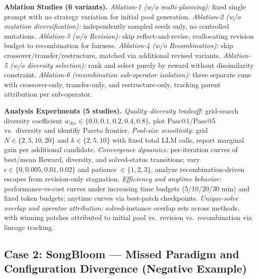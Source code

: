 \begin{tcolorbox}
\smallskip
\textbf{Ablation Studies (6 variants).} \textit{Ablation-1 (w/o multi-planning):} fixed single prompt with no strategy variation for initial pool generation. \textit{Ablation-2 (w/o mutation diversification):} independently sampled seeds only, no controlled mutations. \textit{Ablation-3 (w/o Revision):} skip reflect-and-revise, reallocating revision budget to recombination for fairness. \textit{Ablation-4 (w/o Recombination):} skip crossover/transfer/restructure, matched via additional revised variants. \textit{Ablation-5 (w/o diversity selection):} rank and select purely by reward without dissimilarity constraint. \textit{Ablation-6 (recombination sub-operator isolation):} three separate runs with crossover-only, transfer-only, and restructure-only, tracking parent attribution per sub-operator.

\smallskip
\textbf{Analysis Experiments (5 studies).} \textit{Quality--diversity tradeoff:} grid-search diversity coefficient $w_{div} \in \{0.0,0.1,0.2,0.4,0.8\}$, plot Pass@1/Pass@5 vs.\ diversity and identify Pareto frontier. \textit{Pool-size sensitivity:} grid $N \in \{2,5,10,20\}$ and $k \in \{2,5,10\}$ with fixed total LLM calls, report marginal gain per additional candidate. \textit{Convergence dynamics:} per-iteration curves of best/mean Reward, diversity, and solved-status transitions; vary $\epsilon \in \{0,0.005,0.01,0.02\}$ and patience $\in \{1,2,3\}$, analyze recombination-driven escapes from revision-only stagnation. \textit{Efficiency and anytime behavior:} performance-vs-cost curves under increasing time budgets (5/10/20/30 min) and fixed token budgets; anytime curves via best-patch checkpoints. \textit{Unique-solve overlap and operator attribution:} solved-instance overlap sets across methods, with winning patches attributed to initial pool vs.\ revision vs.\ recombination via lineage tracking.
\end{tcolorbox}

\subsection{Case 2: SongBloom --- Missed Paradigm and Configuration Divergence (Negative Example)}

